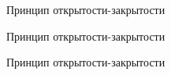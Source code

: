 \documentclass[10pt,pdf,hyperref={unicode}]{beamer}%
\begin{document}
\begin{frame}{Принцип открытости-закрытости}
\begin{figure}[h]
\end{figure}
\end{frame}


\begin{frame}{Принцип открытости-закрытости}
\begin{figure}[h]
\end{figure}
\end{frame}


\begin{frame}{Принцип открытости-закрытости}
\begin{figure}[h]
\end{figure}
\end{frame}
\end{document}
